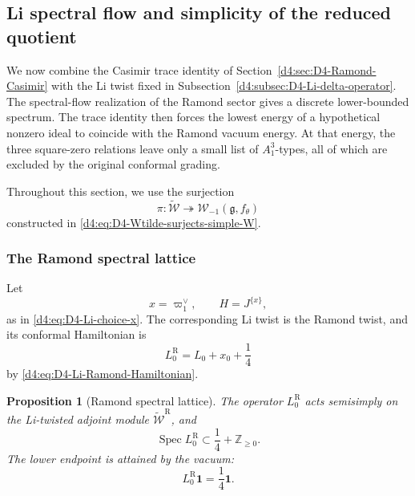 \documentclass[11pt,reqno]{amsart}
\newtheorem{proposition}[theorem]{Proposition}
\theoremstyle{definition}
\theoremstyle{remark}
\begin{document}
\subsection{Li spectral flow and simplicity of the reduced quotient}
\label{d4:sec:D4-Li-spectral-flow-simplicity}

We now combine the Casimir trace identity of
Section~\ref{d4:sec:D4-Ramond-Casimir} with the Li twist fixed in
Subsection~\ref{d4:subsec:D4-Li-delta-operator}.  The spectral-flow
realization of the Ramond sector gives a discrete lower-bounded spectrum.
The trace identity then forces the lowest energy of a hypothetical
nonzero ideal to coincide with the Ramond vacuum energy.  At that energy,
the three square-zero relations leave only a small list of
\(A_1^3\)-types, all of which are excluded by the original conformal
grading.

Throughout this section, we use the surjection
\begin{equation*}
  \pi:\widetilde{\mathcal W}
  \twoheadrightarrow
  \mathcal W_{-1}(\mathfrak g,f_\theta)
\end{equation*}
constructed in \eqref{d4:eq:D4-Wtilde-surjects-simple-W}.

\subsubsection{The Ramond spectral lattice}


Let
\[
  x=\varpi_1^\vee,
  \qquad
  H=J^{\{x\}},
\]
as in \eqref{d4:eq:D4-Li-choice-x}.  The corresponding Li twist is the
Ramond twist, and its conformal Hamiltonian is
\begin{equation}
  L_0^{\mathrm R}=L_0+x_0+\frac14
  \label{d4:eq:D4-section5-Ramond-Hamiltonian}
\end{equation}
by \eqref{d4:eq:D4-Li-Ramond-Hamiltonian}.

\begin{proposition}[Ramond spectral lattice]
\label{d4:prop:D4-Ramond-spectral-lattice}
The operator \(L_0^{\mathrm R}\) acts semisimply on the Li-twisted
adjoint module \(\widetilde{\mathcal W}^{\mathrm R}\), and
\begin{equation}
  \operatorname{Spec}L_0^{\mathrm R}
  \subset
  \frac14+\mathbb Z_{\ge0}.
  \label{d4:eq:D4-Ramond-spectrum-inclusion}
\end{equation}
The lower endpoint is attained by the vacuum:
\begin{equation}
  L_0^{\mathrm R}\mathbf1=\frac14\mathbf1.
  \label{d4:eq:D4-Ramond-vacuum-energy}
\end{equation}
\end{proposition}
\end{document}
